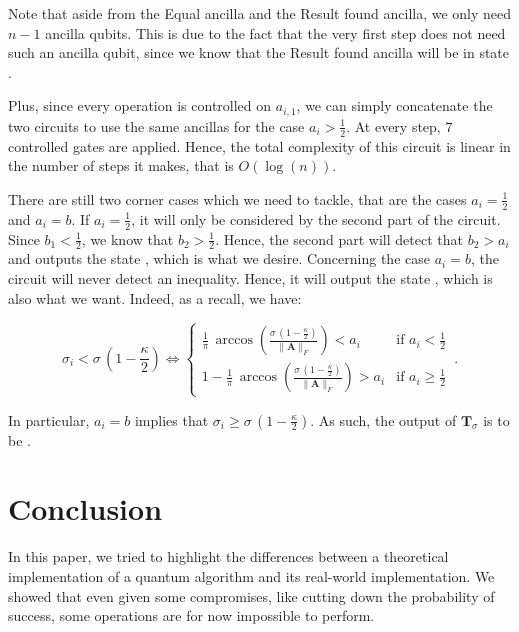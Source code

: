 \documentclass[11pt, a4paper]{article}
\begin{document}
                Note that aside from the Equal ancilla and the Result found ancilla, we only need \(n - 1\) ancilla qubits. This is due to the fact that the very first step does not need such an ancilla qubit, since we know that the Result found ancilla will be in state .
                
                Plus, since every operation is controlled on \(a_{i,1}\), we can simply concatenate the two circuits to use the same ancillas for the case \(a_i>\frac12\). At every step, \(7\) controlled gates are applied. Hence, the total complexity of this circuit is linear in the number of steps it makes, that is \(O(\log(n))\).
                
                There are still two corner cases which we need to tackle, that are the cases \(a_i=\frac12\) and \(a_i=b\). If \(a_i=\frac12\), it will only be considered by the second part of the circuit. Since \(b_1<\frac12\), we know that \(b_2>\frac12\). Hence, the second part will detect that \(b_2>a_i\) and outputs the state , which is what we desire. Concerning the case \(a_i=b\), the circuit will never detect an inequality. Hence, it will output the state , which is also what we want. Indeed, as a recall, we have:
                
                \[\sigma_i < \sigma\,\left(1 - \frac\kappa2\right)\iff\begin{cases}\frac1\pi\,\arccos\left(\frac{\sigma\,\left(1 - \frac\kappa2\right)}{\|\mathbf{A}\|_F}\right) < a_i&\text{if }a_i<\frac12\\1-\frac1\pi\,\arccos\left(\frac{\sigma\,\left(1 - \frac\kappa2\right)}{\|\mathbf{A}\|_F}\right) > a_i&\text{if }a_i\geqslant\frac12\end{cases}\,.\]
                
                In particular, \(a_i=b\) implies that \(\sigma_i \geqslant \sigma\,\left(1 - \frac\kappa2\right)\). As such, the output of \(\mathbf{T}_\sigma\) is to be .
                
    \section{Conclusion}
        In this paper, we tried to highlight the differences between a theoretical implementation of a quantum algorithm and its real-world implementation. We showed that even given some compromises, like cutting down the probability of success, some operations are for now impossible to perform.
        
\end{document}
